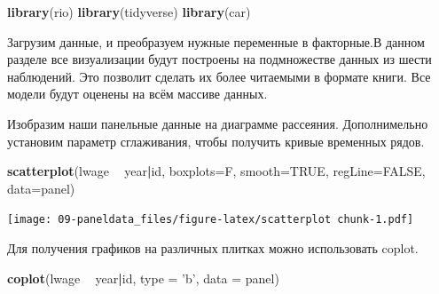\documentclass[]{book}
\newenvironment{Shaded}{\begin{snugshade}}{\end{snugshade}}
\newcommand{\DataTypeTok}[1]{\textcolor[rgb]{0.13,0.29,0.53}{#1}}
\newcommand{\KeywordTok}[1]{\textcolor[rgb]{0.13,0.29,0.53}{\textbf{#1}}}
\newcommand{\NormalTok}[1]{#1}
\newcommand{\OperatorTok}[1]{\textcolor[rgb]{0.81,0.36,0.00}{\textbf{#1}}}
\newcommand{\OtherTok}[1]{\textcolor[rgb]{0.56,0.35,0.01}{#1}}
\newcommand{\StringTok}[1]{\textcolor[rgb]{0.31,0.60,0.02}{#1}}
\begin{document}
\begin{Shaded}
\begin{Highlighting}[]
\KeywordTok{library}\NormalTok{(rio)}
\KeywordTok{library}\NormalTok{(tidyverse)}
\KeywordTok{library}\NormalTok{(car)}
\end{Highlighting}
\end{Shaded}

Загрузим данные, и преобразуем нужные переменные в факторные.В данном разделе все визуализации будут построены на подмножестве данных из шести наблюдений. Это позволит сделать их более читаемыми в формате книги. Все модели будут оценены на всём массиве данных.

\begin{Shaded}
\end{Shaded}

Изобразим наши панельные данные на диаграмме рассеяния. Дополнимельно установим параметр сглаживания, чтобы получить кривые временных рядов.

\begin{Shaded}
\begin{Highlighting}[]
\KeywordTok{scatterplot}\NormalTok{(lwage }\OperatorTok{~}\StringTok{ }\NormalTok{year}\OperatorTok{|}\NormalTok{id, }\DataTypeTok{boxplots=}\NormalTok{F, }\DataTypeTok{smooth=}\OtherTok{TRUE}\NormalTok{, }\DataTypeTok{regLine=}\OtherTok{FALSE}\NormalTok{, }\DataTypeTok{data=}\NormalTok{panel)}
\end{Highlighting}
\end{Shaded}

\texttt{[image: 09-paneldata\_files/figure-latex/scatterplot chunk-1.pdf]}

Для получения графиков на различных плитках можно использовать coplot.

\begin{Shaded}
\begin{Highlighting}[]
\KeywordTok{coplot}\NormalTok{(lwage }\OperatorTok{~}\StringTok{ }\NormalTok{year}\OperatorTok{|}\NormalTok{id, }\DataTypeTok{type =} \StringTok{'b'}\NormalTok{, }\DataTypeTok{data =}\NormalTok{ panel)}
\end{Highlighting}
\end{Shaded}
\end{document}
